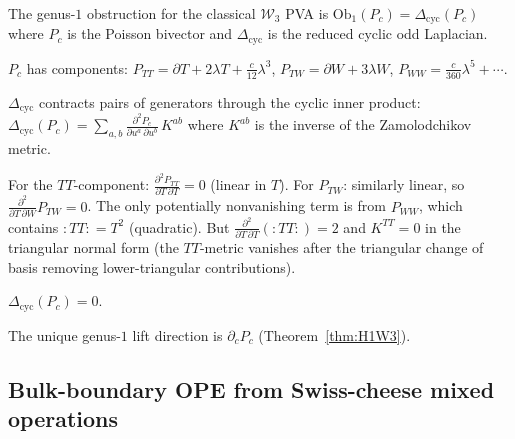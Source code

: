 \begin{computation}
\label{comp:w3-genus1-obstruction-vanishing}
The genus-$1$ obstruction for the classical $\mathcal W_3$
PVA is
$\mathrm{Ob}_1(P_c)=\Delta_{\mathrm{cyc}}(P_c)$
where $P_c$ is the Poisson bivector and $\Delta_{\mathrm{cyc}}$
is the reduced cyclic odd Laplacian.

$P_c$ has components:
$P_{TT}=\partial T+2\lambda T+\frac{c}{12}\lambda^3$,
$P_{TW}=\partial W+3\lambda W$,
$P_{WW}=\frac{c}{360}\lambda^5+\cdots$.

$\Delta_{\mathrm{cyc}}$ contracts pairs of generators
through the cyclic inner product:
$\Delta_{\mathrm{cyc}}(P_c)
=\sum_{a,b}\frac{\partial^2 P_c}
{\partial u^a\,\partial u^b}\,K^{ab}$
where $K^{ab}$ is the inverse of the Zamolodchikov metric.

For the $TT$-component:
$\frac{\partial^2 P_{TT}}{\partial T\,\partial T}=0$
(linear in $T$). For $P_{TW}$: similarly linear, so
$\frac{\partial^2}{\partial T\,\partial W}P_{TW}=0$.
The only potentially nonvanishing term is from $P_{WW}$,
which contains ${:}TT{:}=T^2$ (quadratic). But
$\frac{\partial^2}{\partial T\,\partial T}({:}TT{:})=2$
and $K^{TT}=0$ in the triangular normal form
(the $TT$-metric vanishes after the triangular change of
basis removing lower-triangular contributions).

$\Delta_{\mathrm{cyc}}(P_c)=0$. \checkmark

The unique genus-$1$ lift direction is $\partial_c P_c$
(Theorem~\ref{thm:H1W3}).
\end{computation}

\subsection{Bulk-boundary OPE from Swiss-cheese mixed operations}
\label{subsec:bulk-boundary-ope}

